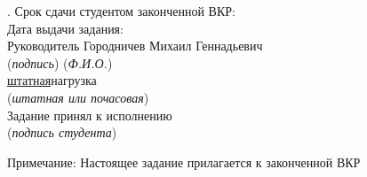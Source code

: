 {\begin{tabular}{@{}p{}p{}p{}@{}}
\end{tabular}

\vspace{1.5em}

. Срок сдачи студентом законченной ВКР: \hrulefill\\
 \hspace{1em}Дата выдачи задания: \hrulefill\\
 \hspace{1em}Руководитель\underline{\hspace{7cm}} \hspace{1em}Городничев Михаил Геннадьевич\\
 \hspace*{5cm}(\textit{подпись}) \hspace{5cm}(\textit{Ф.И.О.})\\
 \noindent \underline{\hspace{7cm}}\underline{штатная}\underline{\hspace{6cm}}нагрузка\\
\hspace*{5cm}(\textit{штатная или почасовая})\\

\noindent Задание принял к исполнению\underline{\hspace{11cm}}\\
\hspace*{9cm}(\textit{подпись студента})\\
\begin{center}
    Примечание: Настоящее задание прилагается к законченной ВКР
\end{center}
}
\thispagestyle{empty}
\clearpage
\setcounter{page}{3}